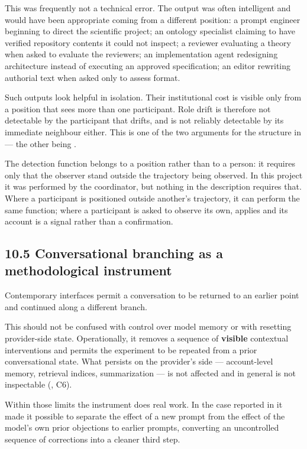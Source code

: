 This was frequently not a technical error. The output was often intelligent and would have been appropriate coming from a different position: a prompt engineer beginning to direct the scientific project; an ontology specialist claiming to have verified repository contents it could not inspect; a reviewer evaluating a theory when asked to evaluate the reviewers; an implementation agent redesigning architecture instead of executing an approved specification; an editor rewriting authorial text when asked only to assess format.

Such outputs look helpful in isolation. Their institutional cost is visible only from a position that sees more than one participant. Role drift is therefore not detectable by the participant that drifts, and is not reliably detectable by its immediate neighbour either. This is one of the two arguments for the structure in  — the other being .

The detection function belongs to a position rather than to a person: it requires only that the observer stand outside the trajectory being observed. In this project it was performed by the coordinator, but nothing in the description requires that. Where a participant is positioned outside another's trajectory, it can perform the same function; where a participant is asked to observe its own,  applies and its account is a signal rather than a confirmation.


\subsection*{10.5 Conversational branching as a methodological instrument}
\label{sec:en:10.5}

Contemporary interfaces permit a conversation to be returned to an earlier point and continued along a different branch.

This should not be confused with control over model memory or with resetting provider-side state. Operationally, it removes a sequence of \textbf{visible} contextual interventions and permits the experiment to be repeated from a prior conversational state. What persists on the provider's side — account-level memory, retrieval indices, summarization — is not affected and in general is not inspectable (, C6).

Within those limits the instrument does real work. In the case reported in  it made it possible to separate the effect of a new prompt from the effect of the model's own prior objections to earlier prompts, converting an uncontrolled sequence of corrections into a cleaner third step.

